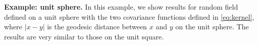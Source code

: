 \documentclass[11pt]{amsart}
\begin{document}
%



{\bf Example: unit sphere.} In this example, we show results for random field defined on a unit sphere with the two covariance functions defined in \eqref{eq:kernel}, where $|x-y|$ is the geodesic distance between $x$ and $y$ on the unit sphere. The results are very similar to those on the unit square.
\end{document}
